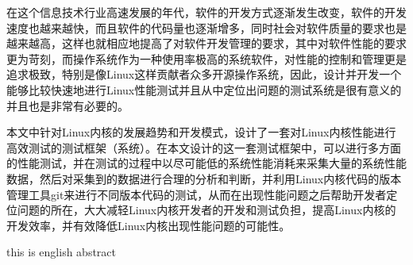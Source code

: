 




\makeatletter



\makeatother





\begin{cabstract}
在这个信息技术行业高速发展的年代，软件的开发方式逐渐发生改变，软件的开发速度也越来越快，而且软件的代码量也逐渐增多，同时社会对软件质量的要求也是越来越高，这样也就相应地提高了对软件开发管理的要求，其中对软件性能的要求更为苛刻，而操作系统作为一种使用率极高的系统软件，对性能的控制和管理更是追求极致，特别是像Linux这样贡献者众多开源操作系统，因此，设计并开发一个能够比较快速地进行Linux性能测试并且从中定位出问题的测试系统是很有意义的并且也是非常有必要的。

本文中针对Linux内核的发展趋势和开发模式，设计了一套对Linux内核性能进行高效测试的测试框架（系统）。在本文设计的这一套测试框架中，可以进行多方面的性能测试，并在测试的过程中以尽可能低的系统性能消耗来采集大量的系统性能数据，然后对采集到的数据进行合理的分析和判断，并利用Linux内核代码的版本管理工具git来进行不同版本代码的测试，从而在出现性能问题之后帮助开发者定位问题的所在，大大减轻Linux内核开发者的开发和测试负担，提高Linux内核的开发效率，并有效降低Linux内核出现性能问题的可能性。
\end{cabstract}



\begin{eabstract}
this is english abstract
\end{eabstract}

